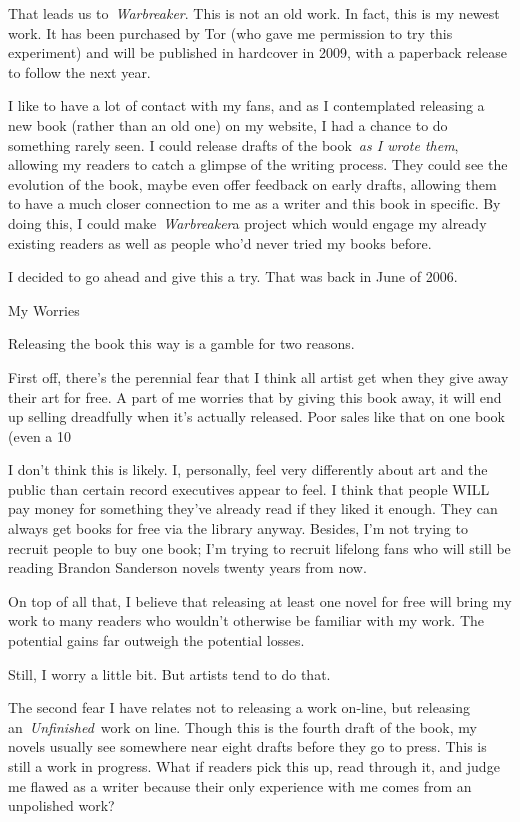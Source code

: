That leads us to~\textit{Warbreaker}. This is not an old work. In fact, this is my newest work. It has been purchased by Tor (who gave me permission to try this experiment) and will be published in hardcover in 2009, with a paperback release to follow the next year.

I like to have a lot of contact with my fans, and as I contemplated releasing a new book (rather than an old one) on my website, I had a chance to do something rarely seen. I could release drafts of the book~\textit{as I wrote them}, allowing my readers to catch a glimpse of the writing process. They could see the evolution of the book, maybe even offer feedback on early drafts, allowing them to have a much closer connection to me as a writer and this book in specific. By doing this, I could make~\textit{Warbreaker}a project which would engage my already existing readers as well as people who’d never tried my books before.

I decided to go ahead and give this a try. That was back in June of 2006.

My Worries

Releasing the book this way is a gamble for two reasons.

First off, there’s the perennial fear that I think all artist get when they give away their art for free. A part of me worries that by giving this book away, it will end up selling dreadfully when it’s actually released. Poor sales like that on one book (even a 10%

I don’t think this is likely. I, personally, feel very differently about art and the public than certain record executives appear to feel. I think that people WILL pay money for something they’ve already read if they liked it enough. They can always get books for free via the library anyway. Besides, I’m not trying to recruit people to buy one book; I’m trying to recruit lifelong fans who will still be reading Brandon Sanderson novels twenty years from now.

On top of all that, I believe that releasing at least one novel for free will bring my work to many readers who wouldn’t otherwise be familiar with my work. The potential gains far outweigh the potential losses.

Still, I worry a little bit. But artists tend to do that.

The second fear I have relates not to releasing a work on-line, but releasing an~\textit{Unfinished}~work on line. Though this is the fourth draft of the book, my novels usually see somewhere near eight drafts before they go to press. This is still a work in progress. What if readers pick this up, read through it, and judge me flawed as a writer because their only experience with me comes from an unpolished work?

